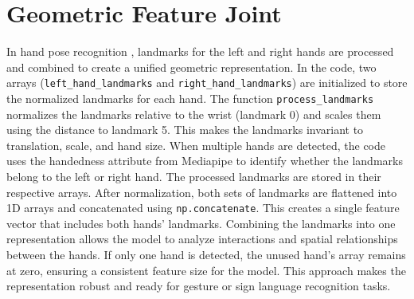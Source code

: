 \section{Geometric Feature Joint}
In hand pose recognition \cite{9426433}, landmarks for the left and right hands are processed and combined to create a unified geometric representation. In the code, two arrays (\verb|left_hand_landmarks| and \verb|right_hand_landmarks|) are initialized to store the normalized landmarks for each hand. The function \verb|process_landmarks| normalizes the landmarks relative to the wrist (landmark 0) and scales them using the distance to landmark 5. This makes the landmarks invariant to translation, scale, and hand size.
When multiple hands are detected, the code uses the handedness attribute from Mediapipe to identify whether the landmarks belong to the left or right hand. The processed landmarks are stored in their respective arrays. After normalization, both sets of landmarks are flattened into 1D arrays and concatenated using \verb|np.concatenate|. This creates a single feature vector that includes both hands' landmarks.
Combining the landmarks into one representation allows the model to analyze interactions and spatial relationships between the hands. If only one hand is detected, the unused hand's array remains at zero, ensuring a consistent feature size for the model. This approach makes the representation robust and ready for gesture or sign language recognition tasks.